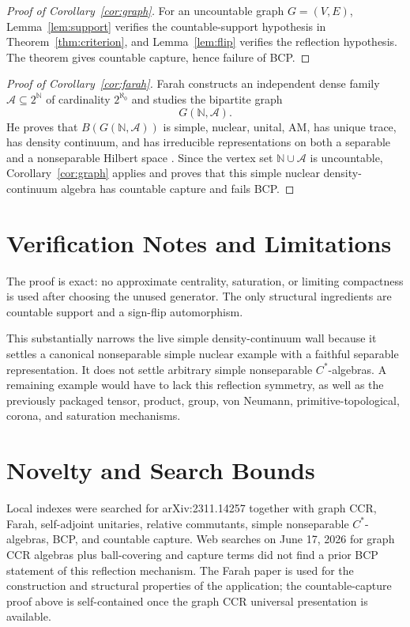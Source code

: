 \documentclass[11pt]{article}
\begin{document}
\begin{proof}[Proof of Corollary~\ref{cor:graph}]
For an uncountable graph \(G=(V,E)\), Lemma~\ref{lem:support} verifies the
countable-support hypothesis in Theorem~\ref{thm:criterion}, and
Lemma~\ref{lem:flip} verifies the reflection hypothesis.  The theorem gives
countable capture, hence failure of BCP.
\end{proof}

\begin{proof}[Proof of Corollary~\ref{cor:farah}]
Farah constructs an independent dense family \(\mathcal A\subseteq 2^{\mathbb
N}\) of cardinality \(2^{\aleph_0}\) and studies the bipartite graph
\[
        G(\mathbb N,\mathcal A).
\]
He proves that \(B(G(\mathbb N,\mathcal A))\) is simple, nuclear, unital, AM,
has unique trace, has density continuum, and has irreducible representations
on both a separable and a nonseparable Hilbert space
\cite[Theorem 1 and Lemmas 1.4, 1.6, 1.8]{FarahCCR}.  Since the vertex set
\(\mathbb N\cup\mathcal A\) is uncountable, Corollary~\ref{cor:graph}
applies and proves that this simple nuclear density-continuum algebra has
countable capture and fails BCP.
\end{proof}

\section*{Verification Notes and Limitations}

The proof is exact: no approximate centrality, saturation, or limiting
compactness is used after choosing the unused generator.  The only structural
ingredients are countable support and a sign-flip automorphism.

This substantially narrows the live simple density-continuum wall because it
settles a canonical nonseparable simple nuclear example with a faithful
separable representation.  It does not settle arbitrary simple nonseparable
\(C^*\)-algebras.  A remaining example would have to lack this reflection
symmetry, as well as the previously packaged tensor, product, group,
von Neumann, primitive-topological, corona, and saturation mechanisms.

\section*{Novelty and Search Bounds}

Local indexes were searched for arXiv:2311.14257 together with graph CCR,
Farah, self-adjoint unitaries, relative commutants, simple nonseparable
\(C^*\)-algebras, BCP, and countable capture.  Web searches on June 17,
2026 for graph CCR algebras plus ball-covering and capture terms did not
find a prior BCP statement of this reflection mechanism.  The Farah paper is
used for the construction and structural properties of the application; the
countable-capture proof above is self-contained once the graph CCR universal
presentation is available.
\end{document}
